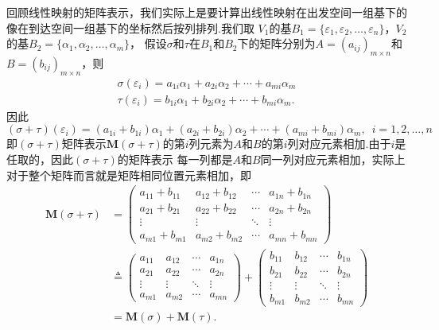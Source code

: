 回顾线性映射的矩阵表示，我们实际上是要计算出线性映射在出发空间一组基下的像在到达空间一组基下的坐标然后按列排列.我们取
$V_1$的基$B_1=\{\varepsilon_1,\varepsilon_2,\ldots,\varepsilon_n\}$，$V_2$的基$B_2=\{\alpha_1,\alpha_2,\ldots,\alpha_m\}$，
假设$\sigma$和$\tau$在$B_1$和$B_2$下的矩阵分别为$A=(a_{ij})_{m\times n}$和$B=(b_{ij})_{m\times n}$，则
\begin{gather*}
    \sigma(\varepsilon_i)=a_{1i}\alpha_1+a_{2i}\alpha_2+\cdots+a_{mi}\alpha_m \\
    \tau(\varepsilon_i)=b_{1i}\alpha_1+b_{2i}\alpha_2+\cdots+b_{mi}\alpha_m.
\end{gather*}
因此
\[(\sigma+\tau)(\varepsilon_i)=(a_{1i}+b_{1i})\alpha_1+(a_{2i}+b_{2i})\alpha_2+\cdots+(a_{mi}+b_{mi})\alpha_m,\enspace i=1,2,\ldots,n\]
即$(\sigma+\tau)$矩阵表示$\mathbf{M}(\sigma+\tau)$的第$i$列元素为$A$和$B$的第$i$列对应元素相加.由于$i$是任取的，因此$(\sigma+\tau)$的矩阵表示
每一列都是$A$和$B$同一列对应元素相加，实际上对于整个矩阵而言就是矩阵相同位置元素相加，即
\begin{align*}
    \mathbf{M}(\sigma+\tau)&=\begin{pmatrix}
        a_{11}+b_{11} & a_{12}+b_{12} & \cdots & a_{1n}+b_{1n} \\
        a_{21}+b_{21} & a_{22}+b_{22} & \cdots & a_{2n}+b_{2n} \\
        \vdots & \vdots & \ddots & \vdots \\
        a_{m1}+b_{m1} & a_{m2}+b_{m2} & \cdots & a_{mn}+b_{mn}
    \end{pmatrix} \\
    &\triangleq\begin{pmatrix}
        a_{11} & a_{12} & \cdots & a_{1n} \\
        a_{21} & a_{22} & \cdots & a_{2n} \\
        \vdots & \vdots & \ddots & \vdots \\
        a_{m1} & a_{m2} & \cdots & a_{mn}
    \end{pmatrix}+\begin{pmatrix}
        b_{11} & b_{12} & \cdots & b_{1n} \\
        b_{21} & b_{22} & \cdots & b_{2n} \\
        \vdots & \vdots & \ddots & \vdots \\
        b_{m1} & b_{m2} & \cdots & b_{mn}
    \end{pmatrix} \\
    &=\mathbf{M}(\sigma)+\mathbf{M}(\tau).
\end{align*}

